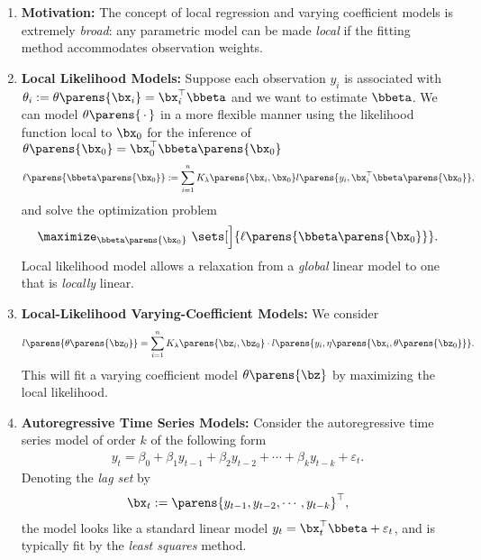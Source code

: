 \documentclass[12pt]{article}
\begin{document}
\begin{enumerate}[label=\textbf{\arabic*.}]

	\item \textbf{Motivation:} The concept of local regression and varying coefficient models is extremely \emph{broad}: any parametric model can be made \emph{local} if the fitting method accommodates observation weights. 
	
	\item \textbf{Local Likelihood Models:} Suppose each observation $y_i$ is associated with $\theta_i := \theta \parens{\bx_i} = \bx_i^\top \bbeta$ and we want to estimate $\bbeta$. We can model $\theta \parens{\,\cdot\,}$ in a more flexible manner using the likelihood function local to $\bx_0$ for the inference of $\theta\parens{\bx_0} = \bx_0^\top \bbeta\parens{\bx_0}$ 
	\begin{align*}
		\ell \parens{\bbeta \parens{\bx_0}} := \sum_{i=1}^n K_{\lambda} \parens{\bx_i, \bx_0} l \parens{y_i, \bx_i^\top \bbeta \parens{\bx_0}}, 
	\end{align*}
	and solve the optimization problem 
	\begin{align*}
		\maximize_{\bbeta \parens{\bx_0}} \ \sets[\Big]{ \ell \parens{\bbeta \parens{\bx_0}}}. 
	\end{align*}
	Local likelihood model allows a relaxation from a \textit{global} linear model to one that is \textit{locally} linear. 
	
	\item \textbf{Local-Likelihood Varying-Coefficient Models:} We consider
	\begin{align*}
		l \parens{\theta\parens{\bz_0}} = \sum_{i=1}^n K_\lambda \parens{\bz_i, \bz_0} \cdot l\parens{y_i, \eta\parens{\bx_i, \theta \parens{\bz_0}}}. 
	\end{align*}
	This will fit a varying coefficient model $\theta \parens{\bz}$ by maximizing the local likelihood. 
	
	\item \textbf{Autoregressive Time Series Models:} Consider the autoregressive time series model of order $k$ of the following form 
	\begin{align*}
		y_t = \beta_0 + \beta_1 y_{t-1} + \beta_2 y_{t-2} + \cdots + \beta_k y_{t-k} + \varepsilon_t. 
	\end{align*}  
	Denoting the \textit{lag set} by 
	\begin{align*}
		\bx_t := \parens{y_{t-1}, y_{t-2}, \cdots, y_{t-k}}^\top, 
	\end{align*}
	the model looks like a standard linear model $ y_t = \bx_t^\top \bbeta + \varepsilon_t$, and is typically fit by the \textit{least squares} method. 
	

\end{enumerate}
\end{document}
